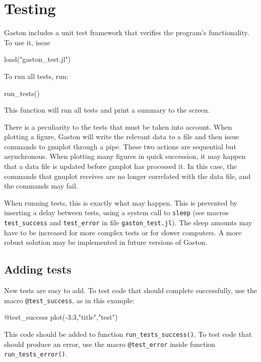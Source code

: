 \documentclass[11pt]{article}
\newcommand{\cmd}[1]{\texttt{#1}}
\begin{document}
\section{Testing}
\label{tests}

Gaston includes a unit test framework that verifies the program's
functionality. To use it, issue
\begin{juliacode}
load("gaston_test.jl")
\end{juliacode}
To run all tests, run:
\begin{juliacode}
run_tests()
\end{juliacode}
This function will run all tests and print a summary to the screen.

There is a peculiarity to the tests that must be taken into account. When
plotting a figure, Gaston will write the relevant data to a file and then issue
commands to gnuplot through a pipe. These two actions are sequential but
asynchronous. When plotting many figures in quick succession, it may happen
that a data file is updated before gnuplot has processed it. In this case, the
commands that gnuplot receives are no longer correlated with the data file, and
the commands may fail.

When running tests, this is exactly what may happen. This is prevented by
inserting a delay between tests, using a system call to \cmd{sleep} (see macros
\cmd{test\_success} and \cmd{test\_error} in file \cmd{gaston\_test.jl}). The
sleep amounts may have to be increased for more complex tests or for slower
computers.  A more robust solution may be implemented in future versions of
Gaston.

\subsection{Adding tests}

New tests are easy to add. To test code that should complete successfully,
use the macro \cmd{@test\_success}, as in this example:
\begin{juliacode}
@test_success plot(-3:3,"title","test")
\end{juliacode}
This code should be added to function \cmd{run\_tests\_success()}. To test code
that should produce an error, use the macro \cmd{@test\_error} inside function
\cmd{run\_tests\_error()}.
\end{document}
